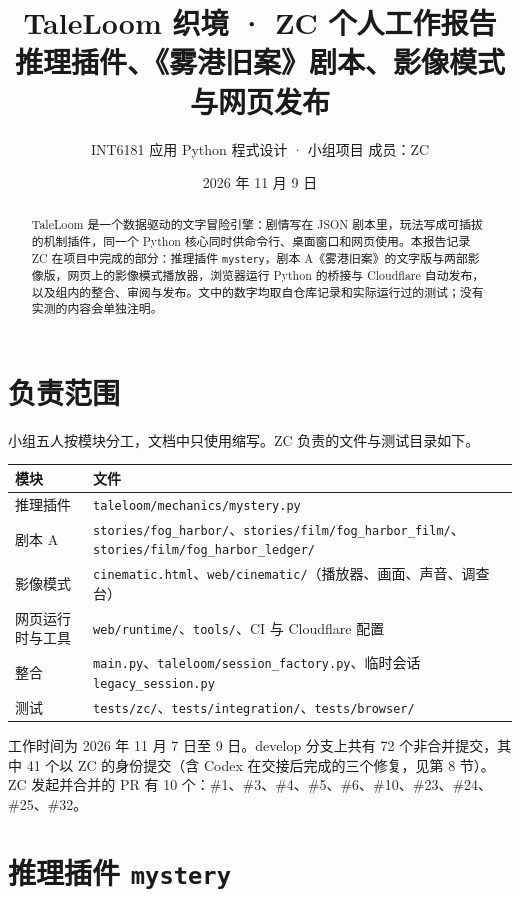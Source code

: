 \documentclass[11pt,a4paper,fontset=mac]{ctexart}
\title{\textbf{TaleLoom 织境 · ZC 个人工作报告}\\[4pt]
  \large 推理插件、《雾港旧案》剧本、影像模式与网页发布}
\author{INT6181 应用 Python 程式设计 · 小组项目 \quad 成员：ZC}
\date{2026 年 11 月 9 日}
\begin{document}
\maketitle

\begin{abstract}
TaleLoom 是一个数据驱动的文字冒险引擎：剧情写在 JSON 剧本里，玩法写成可插拔的机制插件，同一个 Python 核心同时供命令行、桌面窗口和网页使用。本报告记录 ZC 在项目中完成的部分：推理插件 \texttt{mystery}，剧本 A《雾港旧案》的文字版与两部影像版，网页上的影像模式播放器，浏览器运行 Python 的桥接与 Cloudflare 自动发布，以及组内的整合、审阅与发布。文中的数字均取自仓库记录和实际运行过的测试；没有实测的内容会单独注明。
\end{abstract}

\section{负责范围}

小组五人按模块分工，文档中只使用缩写。ZC 负责的文件与测试目录如下。

\begin{table}[h]
\centering
\begin{tabularx}{\linewidth}{@{}p{3.2cm}L@{}}
\toprule
模块 & 文件 \\
\midrule
推理插件 & \texttt{taleloom/mechanics/mystery.py} \\
剧本 A & \texttt{stories/fog\_harbor/}、\texttt{stories/film/fog\_harbor\_film/}、\texttt{stories/film/fog\_harbor\_ledger/} \\
影像模式 & \texttt{cinematic.html}、\texttt{web/cinematic/}（播放器、画面、声音、调查台） \\
网页运行时与工具 & \texttt{web/runtime/}、\texttt{tools/}、CI 与 Cloudflare 配置 \\
整合 & \texttt{main.py}、\texttt{taleloom/session\_factory.py}、临时会话 \texttt{legacy\_session.py} \\
测试 & \texttt{tests/zc/}、\texttt{tests/integration/}、\texttt{tests/browser/} \\
\bottomrule
\end{tabularx}
\end{table}

工作时间为 2026 年 11 月 7 日至 9 日。develop 分支上共有 72 个非合并提交，其中 41 个以 ZC 的身份提交（含 Codex 在交接后完成的三个修复，见第 8 节）。ZC 发起并合并的 PR 有 10 个：\#1、\#3、\#4、\#5、\#6、\#10、\#23、\#24、\#25、\#32。

\section{推理插件 \texttt{mystery}}
\end{document}
